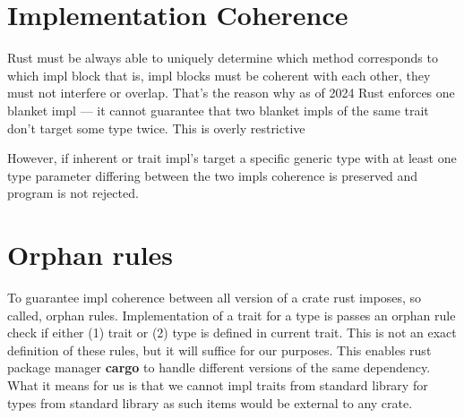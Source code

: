 \section{Implementation Coherence}
\label{sec:coherence}

Rust must be always able to uniquely determine which method corresponds to which impl block that is, impl blocks must be coherent with each other, they must not interfere or overlap.
That's the reason why as of 2024 Rust enforces one blanket impl --- it cannot guarantee that two blanket impls of the same trait don't target some type twice.
This is overly restrictive 

However, if inherent or trait impl's target a specific generic type with at least one type parameter differing between the two impls coherence is preserved and program is not rejected.

\section{Orphan rules}

To guarantee impl coherence between all version of a crate rust imposes, so called, orphan rules.
Implementation of a trait for a type is passes an orphan rule check if either (1) trait or (2) type is defined in current trait.
This is not an exact definition of these rules, but it will suffice for our purposes.
This enables rust package manager \textbf{cargo} to handle different versions of the same dependency.
What it means for us is that we cannot impl traits from standard library for types from standard library as such items would be external to any crate.
